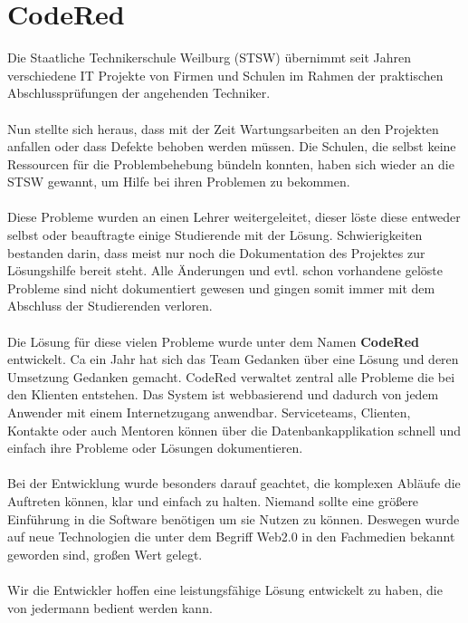\chapter{CodeRed}  %
\label{chapter:CodeRed}  %

Die Staatliche Technikerschule Weilburg (STSW)
übernimmt seit Jahren verschiedene IT Projekte
von Firmen und Schulen im Rahmen der praktischen
Abschlussprüfungen der angehenden Techniker. \\
\\
Nun stellte sich heraus, dass mit der Zeit
Wartungsarbeiten an den Projekten anfallen oder
dass Defekte behoben werden müssen.
Die Schulen, die selbst keine Ressourcen für die
Problembehebung bündeln konnten, haben sich
wieder an die STSW gewannt, um Hilfe bei ihren
Problemen zu bekommen. \\
\\
Diese Probleme wurden an einen Lehrer weitergeleitet,
dieser löste diese entweder selbst oder
beauftragte einige Studierende mit der Lösung.
Schwierigkeiten bestanden darin, dass meist nur noch die
Dokumentation des Projektes zur Lösungshilfe bereit
steht. Alle Änderungen und evtl. schon vorhandene
gelöste Probleme sind nicht dokumentiert gewesen und gingen
somit immer mit dem Abschluss der Studierenden verloren.\\
\\
Die Lösung für diese vielen Probleme wurde unter dem Namen \textbf{CodeRed} 
entwickelt. Ca ein Jahr hat sich das Team Gedanken über eine Lösung und 
deren Umsetzung Gedanken gemacht. CodeRed verwaltet zentral alle Probleme 
die bei den Klienten entstehen. Das System ist webbasierend und dadurch von jedem 
Anwender mit einem Internetzugang anwendbar. Serviceteams, Clienten, Kontakte oder auch Mentoren können über die Datenbankapplikation schnell und einfach ihre Probleme oder Lösungen dokumentieren. \\
\\
Bei der Entwicklung wurde besonders darauf geachtet, die komplexen Abläufe die Auftreten können, klar und einfach zu halten. Niemand sollte eine größere Einführung in die Software benötigen um sie Nutzen zu können. Deswegen wurde auf neue Technologien die unter dem Begriff Web2.0 in den Fachmedien bekannt geworden sind, großen Wert gelegt.\\
\\
Wir die Entwickler hoffen eine leistungsfähige Lösung entwickelt zu haben, die von jedermann bedient werden kann.   
\newpage
